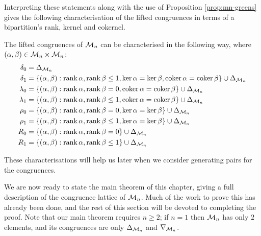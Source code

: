 Interpreting these statements along with the use of Proposition
\ref{prop:mn-greens} gives the following characterisation of the lifted
congruences in terms of a bipartition's rank, kernel and cokernel.

\begin{proposition}
  \label{prop:mn-cong-char}
  The lifted congruences of $\mathcal{M}_n$ can be characterised in the following way,
  where $(\alpha, \beta) \in \mathcal{M}_n \times \mathcal{M}_n$:
  \begin{align*}
    \delta_0 &= \Delta_{\mathcal{M}_n} \\
    \delta_1 &= \{(\alpha,\beta) :
                  \operatorname{rank}\alpha,\operatorname{rank}\beta \leq 1,
                  \ker\alpha = \ker\beta,
                  \operatorname{coker}\alpha = \operatorname{coker}\beta\} \cup \Delta_{\mathcal{M}_n} \\
    \lambda_0 &= \{(\alpha,\beta) :
                   \operatorname{rank}\alpha,\operatorname{rank}\beta = 0,
                   \operatorname{coker}\alpha = \operatorname{coker}\beta\} \cup \Delta_{\mathcal{M}_n} \\
    \lambda_1 &= \{(\alpha,\beta) :
                   \operatorname{rank}\alpha,\operatorname{rank}\beta \leq 1,
                   \operatorname{coker}\alpha = \operatorname{coker}\beta\} \cup \Delta_{\mathcal{M}_n} \\
    \rho_0 &= \{(\alpha,\beta) :
                \operatorname{rank}\alpha,\operatorname{rank}\beta = 0,
                \ker\alpha = \ker\beta\} \cup \Delta_{\mathcal{M}_n} \\
    \rho_1 &= \{(\alpha,\beta) :
                \operatorname{rank}\alpha,\operatorname{rank}\beta \leq 1,
                \ker\alpha = \ker\beta\} \cup \Delta_{\mathcal{M}_n} \\
    R_0 &= \{(\alpha,\beta) :
             \operatorname{rank}\alpha,\operatorname{rank}\beta = 0\} \cup \Delta_{\mathcal{M}_n} \\
    R_1 &= \{(\alpha,\beta) :
             \operatorname{rank}\alpha,\operatorname{rank}\beta \leq 1\} \cup \Delta_{\mathcal{M}_n}
  \end{align*}
\end{proposition}
These characterisations will help us later when we consider generating pairs for
the congruences.

We are now ready to state the main theorem of this chapter, giving a full
description of the congruence lattice of $\mathcal{M}_n$.  Much of the work to prove
this has already been done, and the rest of this section will be devoted to
completing the proof.  Note that our main theorem requires $n \geq 2$; if
$n = 1$ then $\mathcal{M}_n$ has only $2$ elements, and its congruences are only
$\Delta_{\mathcal{M}_n}$ and $\nabla_{\mathcal{M}_n}$.

